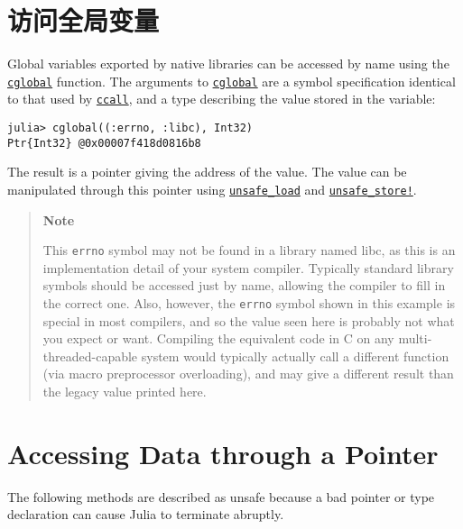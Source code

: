 \section{访问全局变量}



Global variables exported by native libraries can be accessed by name using the \hyperlink{2746947069730856184}{\texttt{cglobal}} function. The arguments to \hyperlink{2746947069730856184}{\texttt{cglobal}} are a symbol specification identical to that used by \hyperlink{14245046751182637566}{\texttt{ccall}}, and a type describing the value stored in the variable:




\begin{verbatim}
julia> cglobal((:errno, :libc), Int32)
Ptr{Int32} @0x00007f418d0816b8
\end{verbatim}



The result is a pointer giving the address of the value. The value can be manipulated through this pointer using \hyperlink{13744149973765810952}{\texttt{unsafe\_load}} and \hyperlink{4579672834750013041}{\texttt{unsafe\_store!}}.



\begin{quote}
\textbf{Note}

This \texttt{errno} symbol may not be found in a library named {\textquotedbl}libc{\textquotedbl}, as this is an implementation detail of your system compiler. Typically standard library symbols should be accessed just by name, allowing the compiler to fill in the correct one. Also, however, the \texttt{errno} symbol shown in this example is special in most compilers, and so the value seen here is probably not what you expect or want. Compiling the equivalent code in C on any multi-threaded-capable system would typically actually call a different function (via macro preprocessor overloading), and may give a different result than the legacy value printed here.

\end{quote}


\hypertarget{14428977823562595292}{}


\section{Accessing Data through a Pointer}



The following methods are described as {\textquotedbl}unsafe{\textquotedbl} because a bad pointer or type declaration can cause Julia to terminate abruptly.



